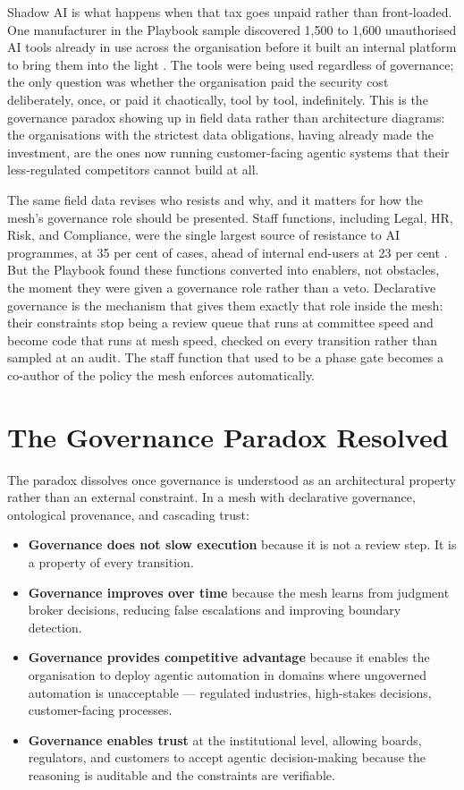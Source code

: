 Shadow AI is what happens when that tax goes unpaid rather than front-loaded. One manufacturer in the Playbook sample discovered 1,500 to 1,600 unauthorised AI tools already in use across the organisation before it built an internal platform to bring them into the light \parencite{Pereira2026Playbook}. The tools were being used regardless of governance; the only question was whether the organisation paid the security cost deliberately, once, or paid it chaotically, tool by tool, indefinitely. This is the governance paradox showing up in field data rather than architecture diagrams: the organisations with the strictest data obligations, having already made the investment, are the ones now running customer-facing agentic systems that their less-regulated competitors cannot build at all.

The same field data revises who resists and why, and it matters for how the mesh's governance role should be presented. Staff functions, including Legal, HR, Risk, and Compliance, were the single largest source of resistance to AI programmes, at 35 per cent of cases, ahead of internal end-users at 23 per cent \parencite{Pereira2026Playbook}. But the Playbook found these functions converted into enablers, not obstacles, the moment they were given a governance role rather than a veto. Declarative governance is the mechanism that gives them exactly that role inside the mesh: their constraints stop being a review queue that runs at committee speed and become code that runs at mesh speed, checked on every transition rather than sampled at an audit. The staff function that used to be a phase gate becomes a co-author of the policy the mesh enforces automatically.

\section{The Governance Paradox Resolved}

The paradox dissolves once governance is understood as an architectural property rather than an external constraint. In a mesh with declarative governance, ontological provenance, and cascading trust:

\begin{itemize}
  \item \textbf{Governance does not slow execution} because it is not a review step. It is a property of every transition.
  \item \textbf{Governance improves over time} because the mesh learns from judgment broker decisions, reducing false escalations and improving boundary detection.
  \item \textbf{Governance provides competitive advantage} because it enables the organisation to deploy agentic automation in domains where ungoverned automation is unacceptable --- regulated industries, high-stakes decisions, customer-facing processes.
  \item \textbf{Governance enables trust} at the institutional level, allowing boards, regulators, and customers to accept agentic decision-making because the reasoning is auditable and the constraints are verifiable.
\end{itemize}

